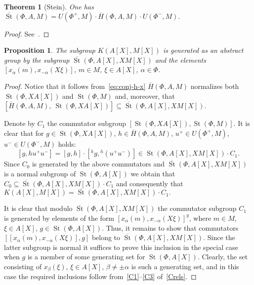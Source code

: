 \documentclass[oneside, 8pt]{amsart}
\newtheorem{prop}[lemma]{Proposition}
\newtheorem{externaltheorem}[lemma]{Theorem}
\theoremstyle{remark}
\theoremstyle{definition}
\numberwithin{lemma}{section}
\numberwithin{prop}{section}
\numberwithin{corollary}{section}
\numberwithin{externaltheorem}{section}
\DeclareMathOperator{\St}{St}
\numberwithin{equation}{section}
\begin{document}
\begin{externaltheorem}[Stein] \label{thm:Stein} One has $\overline{\St}(\Phi, A, M) = U(\Phi^+, M) \cdot \overline{H}(\Phi, A, M) \cdot U(\Phi^-, M).$ \end{externaltheorem} \begin{proof} See~\cite[Theorem~2.4]{Ste73}. \end{proof}

\begin{prop} \label{Kgen} The subgroup $K(A[X], M[X])$ is generated as an abstract group by the subgroup $\overline{\St}(\Phi, A[X], XM[X])$ and
 the elements $[x_\alpha(m), x_{-\alpha}(X\xi)]$, $m \in M$, $\xi \in A[X]$, $\alpha \in \Phi$. \end{prop}
\begin{proof} Notice that it follows from~\eqref{eq:conj-h-x} $\overline{H}(\Phi, A, M)$ normalizes both $\St(\Phi, XA[X])$ and $\St(\Phi, M)$ and, moreover, that $[\overline{H}(\Phi, A, M),\ \St(\Phi, XA[X])] \subseteq \overline{\St}(\Phi, A[X], XM[X])$. 

Denote by $C_1$ the commutator subgroup $[\St(\Phi, XA[X]), \St(\Phi, M)]$.
It is clear that for $g \in \St(\Phi, XA[X])$, $h \in \overline{H}(\Phi, A, M)$, $u^+ \in U(\Phi^+, M)$, $u^- \in U(\Phi^-, M)$ holds:
\[ [g, h u^+ u^-] = [g, h] \cdot [{}^{h}\!g, {}^{h}\!(u^+u^-)] \in \St(\Phi, A[X], XM[X]) \cdot C_1.\]
Since $C_0$ is generated by the above commutators and $\overline{\St}(\Phi, A[X], XM[X])$ is a normal subgroup of $\St(\Phi, A[X])$
we obtain that $C_0 \subseteq \overline{\St}(\Phi, A[X], XM[X]) \cdot C_1$ and consequently that
$K(A[X], M[X]) = \overline{\St}(\Phi, A[X], XM[X]) \cdot C_1.$
 
It is clear that modulo $\overline{\St}(\Phi, A[X], XM[X])$ the commutator subgroup $C_1$ is generated by elements of the form $[x_\alpha(m), x_{-\alpha}(X\xi)]^g$, where $m \in M$, $\xi \in A[X]$, $g \in \St(\Phi, A[X])$.
Thus, it remains to show that commutators $[[x_\alpha(m), x_{-\alpha}(X\xi)], g]$ belong to $\overline{\St}(\Phi, A[X], XM[X])$.
Since the latter subgroup is normal it suffices to prove this inclusion in the special case when $g$ is a member of some generating set for $\St(\Phi, A[X])$.
Clearly, the set consisting of $x_\beta(\xi)$, $\xi \in A[X]$, $\beta \neq \pm \alpha$ is such a generating set, 
 and in this case the required inclusions follow from~\eqref{C1}--\eqref{C3} of~\cref{Crels}. \end{proof}
\end{document}
